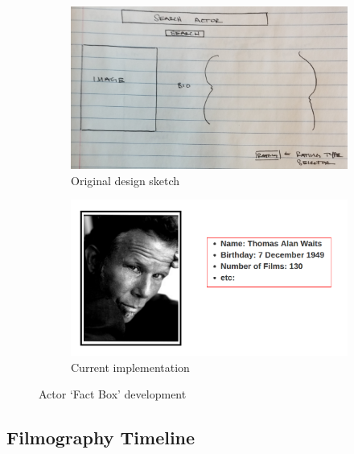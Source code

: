 \documentclass[12pt]{article}
\begin{document}
		\begin{figure}[h!]
			\centering
			\begin{subfigure}[t]{.5\textwidth}
				  \centering
				  \includegraphics[width=\linewidth]{images/actorFactBox_crop.png}
				  \caption{Original design sketch}
				  \label{fig:sub1}
			\end{subfigure}%
			\begin{subfigure}[t]{.5\textwidth}
				  \centering
				  \includegraphics[width=.8\linewidth]{images/actorBox.png}
				  \caption{Current implementation}
				  \label{fig:sub2}
			\end{subfigure}%
			\caption{Actor `Fact Box' development}
			\label{fig:actorFactBox}
		\end{figure}


\subsection{Filmography Timeline}
\end{document}
